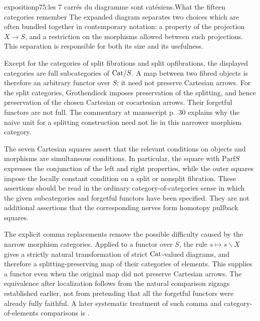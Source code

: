 \begin{dcomment}{exposition}{p75:les 7 carrés du diagramme sont catésiens.}{What the fifteen categories remember}
The expanded diagram separates two choices which are often bundled together in contemporary notation: a property of the projection $X\to S$, and a restriction on the morphisms allowed between such projections. This separation is responsible for both its size and its usefulness.

Except for the categories of split fibrations and split opfibrations, the displayed categories are full subcategories of $\mathrm{Cat}/S$. A map between two fibred objects is therefore an arbitrary functor over $S$; it need not preserve Cartesian arrows. For the split categories, Grothendieck imposes preservation of the splitting, and hence preservation of the chosen Cartesian or cocartesian arrows. Their forgetful functors are not full. The commentary at manuscript p.~30 explains why the naive unit for a splitting construction need not lie in this narrower morphism category.

The seven Cartesian squares assert that the relevant conditions on objects and morphisms are simultaneous conditions. In particular, the square with $\underline{\mathrm{Parf}}S$ expresses the conjunction of the left and right properties, while the outer squares impose the locally constant condition on a split or nonsplit fibration. These assertions should be read in the ordinary category-of-categories sense in which the given subcategories and forgetful functors have been specified. They are not additional assertions that the corresponding nerves form homotopy pullback squares.

The explicit comma replacements remove the possible difficulty caused by the narrow morphism categories. Applied to a functor over $S$, the rule $s\mapsto s\backslash X$ gives a strictly natural transformation of strict $\mathrm{Cat}$-valued diagrams, and therefore a splitting-preserving map of their categories of elements. This supplies a functor even when the original map did not preserve Cartesian arrows. The equivalence after localization follows from the natural comparison zigzags established earlier, not from pretending that all the forgetful functors were already fully faithful. A later systematic treatment of such comma and category-of-elements comparisons is \citet[Theorem~3.8]{Maltsiniotis2005Asphericite}.
\end{dcomment}


